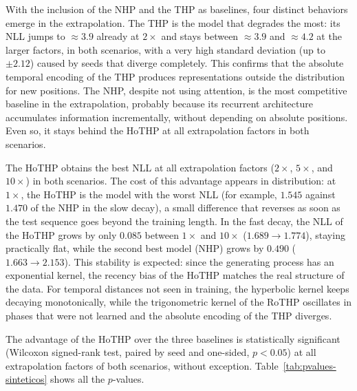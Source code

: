 With the inclusion of the NHP and the THP as baselines, four distinct behaviors emerge in the extrapolation. The THP is the model that degrades the most: its NLL jumps to $\approx 3.9$ already at $2\times$ and stays between $\approx 3.9$ and $\approx 4.2$ at the larger factors, in both scenarios, with a very high standard deviation (up to $\pm 2.12$) caused by seeds that diverge completely. This confirms that the absolute temporal encoding of the THP produces representations outside the distribution for new positions. The NHP, despite not using attention, is the most competitive baseline in the extrapolation, probably because its recurrent architecture accumulates information incrementally, without depending on absolute positions. Even so, it stays behind the HoTHP at all extrapolation factors in both scenarios.

The HoTHP obtains the best NLL at all extrapolation factors ($2\times$, $5\times$, and $10\times$) in both scenarios. The cost of this advantage appears in distribution: at $1\times$, the HoTHP is the model with the worst NLL (for example, $1.545$ against $1.470$ of the NHP in the slow decay), a small difference that reverses as soon as the test sequence goes beyond the training length. In the fast decay, the NLL of the HoTHP grows by only $0.085$ between $1\times$ and $10\times$ ($1.689 \to 1.774$), staying practically flat, while the second best model (NHP) grows by $0.490$ ($1.663 \to 2.153$). This stability is expected: since the generating process has an exponential kernel, the recency bias of the HoTHP matches the real structure of the data. For temporal distances not seen in training, the hyperbolic kernel keeps decaying monotonically, while the trigonometric kernel of the RoTHP oscillates in phases that were not learned and the absolute encoding of the THP diverges.

The advantage of the HoTHP over the three baselines is statistically significant (Wilcoxon signed-rank test, paired by seed and one-sided, $p < 0.05$) at all extrapolation factors of both scenarios, without exception. Table~\ref{tab:pvalues-sinteticos} shows all the $p$-values.

